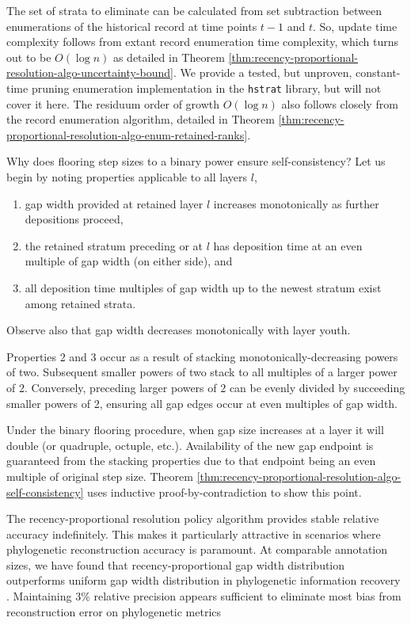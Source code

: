 The set of strata to eliminate can be calculated from set subtraction between enumerations of the historical record at time points $t-1$ and $t$.
So, update time complexity follows from extant record enumeration time complexity, which turns out to be $O(\log n)$ as detailed in Theorem \ref{thm:recency-proportional-resolution-algo-uncertainty-bound}.
We provide a tested, but unproven, constant-time pruning enumeration implementation in the \texttt{hstrat} library, but will not cover it here.
The residuum order of growth $O(\log n)$ also follows closely from the record enumeration algorithm, detailed in Theorem \ref{thm:recency-proportional-resolution-algo-enum-retained-ranks}.

Why does flooring step sizes to a binary power ensure self-consistency?
Let us begin by noting properties applicable to all layers $l$,
\begin{enumerate}
\item gap width provided at retained layer $l$ increases monotonically as further depositions proceed,
\item the retained stratum preceding or at $l$ has deposition time at an even multiple of gap width (on either side), and
\item all deposition time multiples of gap width up to the newest stratum exist among retained strata.
\end{enumerate}
Observe also that gap width decreases monotonically with layer youth.

Properties 2 and 3 occur as a result of stacking monotonically-decreasing powers of two.
Subsequent smaller powers of two stack to all multiples of a larger power of 2.
Conversely, preceding larger powers of 2 can be evenly divided by succeeding smaller powers of 2, ensuring all gap edges occur at even multiples of gap width.

Under the binary flooring procedure, when gap size increases at a layer it will double (or quadruple, octuple, etc.).
Availability of the new gap endpoint is guaranteed from the stacking properties due to that endpoint being an even multiple of original step size.
Theorem \ref{thm:recency-proportional-resolution-algo-self-consistency} uses inductive proof-by-contradiction to show this point.

The recency-proportional resolution policy algorithm provides stable relative accuracy indefinitely.
This makes it particularly attractive in scenarios where phylogenetic reconstruction accuracy is paramount.
At comparable annotation sizes, we have found that recency-proportional gap width distribution outperforms uniform gap width distribution in phylogenetic information recovery \citep{moreno2022hereditary}.
Maintaining 3\% relative precision appears sufficient to eliminate most bias from reconstruction error on phylogenetic metrics \citep{moreno2023toward}

